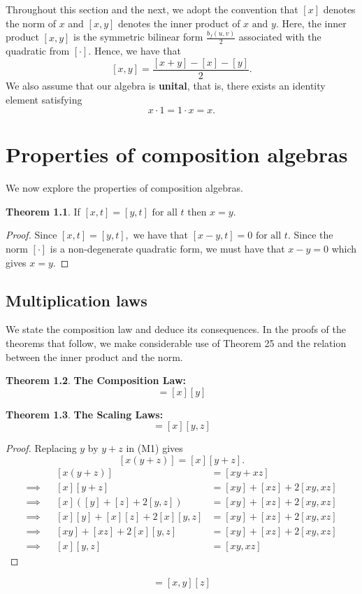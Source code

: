 \documentclass[11pt]{report}
\theoremstyle{plain}
\theoremstyle{definition}
\newtheorem{theorem}{Theorem}
\begin{document}
Throughout this section and the next, we adopt the convention that $ [x]  $ denotes the norm of $ x $ and $ [x,y] $ denotes the inner product of $ x \text{ and } y. $ Here, the inner product $ [x,y] $ is the symmetric bilinear form $ \frac{b_f(u,v)}{2} $ associated with the quadratic from $ [\cdot] $. Hence, we have that $$ [x,y] = \frac{[x+y] - [x] - [y]}{2}.$$ We also assume that our algebra is \textbf{unital}, that is, there exists an identity element satisfying $$ x \cdot 1 = 1 \cdot x =x. $$

\chapter{Properties of composition algebras}
We now explore the properties of composition algebras.
\begin{theorem}
	If $ [x,t] = [y,t] \text{ for all } t $ then $ x = y. $
\end{theorem}
\begin{proof}
	Since $ [x,t] = [y,t], $ we have that $ [x-y,t] = 0 \text{ for all } t. $ Since the norm $ [\cdot] $ is a non-degenerate quadratic form, we must have that $ x-y = 0 $ which gives $ x = y. $
\end{proof}
\section{Multiplication laws}
We state the composition law and deduce its consequences. In the proofs of the theorems that follow, we make considerable use of Theorem 25 and the relation between the inner product and the norm. 
\begin{theorem}
	\textbf{ The Composition Law: }
	\begin{equation}
			[xy] = [x][y] \tag{M1}\label{M1}
	\end{equation}
\end{theorem}
\begin{theorem}
	 \textbf{ The Scaling Laws: }
	 \begin{equation}
	  [xy,xz] = [x][y,z] \tag{M2.1}\label{M2.1} 
	 \end{equation} 
\end{theorem}
\begin{proof}
	Replacing $ y $ by $ y+z $ in  (M1) gives 
	$$ [x(y+z)] = [x][y+z].$$ 
	\begin{align*}
		&&[x(y+z)] &= [xy + xz]\\
		\implies&& [x][y+z] &=[xy]+[xz]+2[xy,xz]\\
		\implies&& [x]([y]+[z]+2[y,z]) &= [xy]+[xz]+2[xy,xz]\\
		\implies&& [x][y] + [x][z] + 2[x][y,z] &= [xy] +[xz]+2[xy,xz]\\
		\implies&& [xy] + [xz] + 2[x][y,z] &= [xy]+[xz]+2[xy,xz]\\
		\implies&& [x][y,z]&=[xy,xz] 
	\end{align*} 
\end{proof}
\begin{equation}
[xz,yz] = [x,y][z] \tag{M2.2}\label{M2.2} 
\end{equation}
\end{document}
